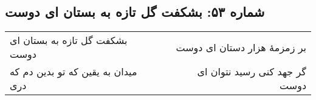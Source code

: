 \begin{center}
\section*{شماره ۵۳: بشکفت گل تازه به بستان ای دوست}
\label{sec:053}
\begin{longtable}{l p{0.5cm} r}
بشکفت گل تازه به بستان ای دوست
&&
بر زمزمهٔ هزار دستان ای دوست
\\
میدان به یقین که تو بدین دم که دری
&&
گر جهد کنی رسید نتوان ای دوست
\\
\end{longtable}
\end{center}
